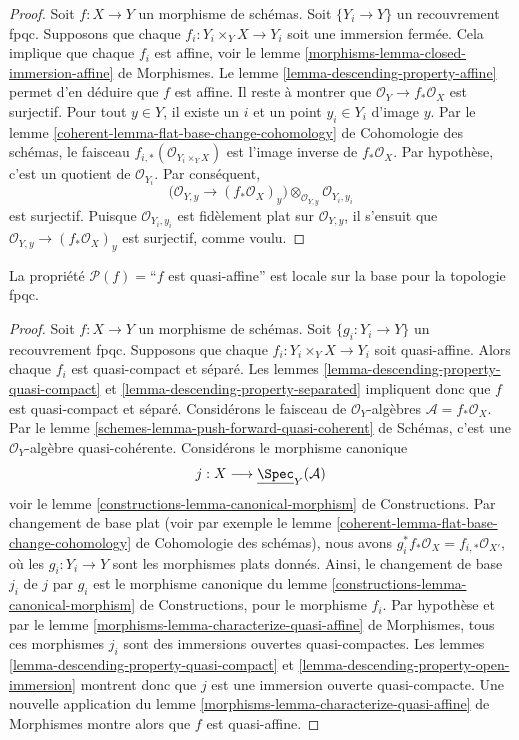 \begin{proof}
Soit $f : X \to Y$ un morphisme de schémas.
Soit $\{Y_i \to Y\}$ un recouvrement fpqc.
Supposons que chaque $f_i : Y_i \times_Y X \to Y_i$
soit une immersion fermée.
Cela implique que chaque $f_i$ est affine, voir
le lemme \ref{morphisms-lemma-closed-immersion-affine} de Morphismes.
Le lemme \ref{lemma-descending-property-affine}
permet d'en déduire que $f$ est affine. Il reste à montrer que
$\mathcal{O}_Y \to f_*\mathcal{O}_X$ est surjectif.
Pour tout $y \in Y$, il existe un $i$ et un point
$y_i \in Y_i$ d'image $y$.
Par le lemme \ref{coherent-lemma-flat-base-change-cohomology}
de Cohomologie des schémas,
le faisceau $f_{i, *}(\mathcal{O}_{Y_i \times_Y X})$
est l'image inverse de $f_*\mathcal{O}_X$.
Par hypothèse, c'est un quotient de $\mathcal{O}_{Y_i}$.
Par conséquent,
$$
\Big(
\mathcal{O}_{Y, y} \longrightarrow (f_*\mathcal{O}_X)_y
\Big)
\otimes_{\mathcal{O}_{Y, y}} \mathcal{O}_{Y_i, y_i}
$$
est surjectif. Puisque $\mathcal{O}_{Y_i, y_i}$ est fidèlement
plat sur $\mathcal{O}_{Y, y}$, il s'ensuit que
$\mathcal{O}_{Y, y} \longrightarrow (f_*\mathcal{O}_X)_y$ est surjectif,
comme voulu.
\end{proof}

\begin{lemma}
\label{lemma-descending-property-quasi-affine}
La propriété $\mathcal{P}(f) =$``$f$ est quasi-affine''
est locale sur la base pour la topologie fpqc.
\end{lemma}

\begin{proof}
Soit $f : X \to Y$ un morphisme de schémas.
Soit $\{g_i : Y_i \to Y\}$ un recouvrement fpqc.
Supposons que chaque $f_i : Y_i \times_Y X \to Y_i$
soit quasi-affine.
Alors chaque $f_i$ est quasi-compact et séparé.
Les lemmes \ref{lemma-descending-property-quasi-compact}
et \ref{lemma-descending-property-separated}
impliquent donc que $f$ est quasi-compact et séparé.
Considérons le faisceau de $\mathcal{O}_Y$-algèbres
$\mathcal{A} = f_*\mathcal{O}_X$.
Par le lemme \ref{schemes-lemma-push-forward-quasi-coherent} de Schémas,
c'est une $\mathcal{O}_Y$-algèbre quasi-cohérente.
Considérons le morphisme canonique
$$
j : X \longrightarrow \underline{\Spec}_Y(\mathcal{A})
$$
voir le lemme \ref{constructions-lemma-canonical-morphism} de Constructions.
Par changement de base plat
(voir par exemple le lemme
\ref{coherent-lemma-flat-base-change-cohomology} de Cohomologie des schémas),
nous avons $g_i^*f_*\mathcal{O}_X = f_{i, *}\mathcal{O}_{X'}$,
où les $g_i : Y_i \to Y$ sont les morphismes plats donnés.
Ainsi, le changement de base $j_i$ de $j$ par $g_i$ est le morphisme canonique
du lemme \ref{constructions-lemma-canonical-morphism} de Constructions,
pour le morphisme $f_i$. Par hypothèse et par
le lemme \ref{morphisms-lemma-characterize-quasi-affine} de Morphismes,
tous ces morphismes $j_i$ sont des immersions ouvertes quasi-compactes.
Les lemmes \ref{lemma-descending-property-quasi-compact} et
\ref{lemma-descending-property-open-immersion} montrent donc que
$j$ est une immersion ouverte quasi-compacte.
Une nouvelle application du
lemme \ref{morphisms-lemma-characterize-quasi-affine} de Morphismes
montre alors que $f$ est quasi-affine.
\end{proof}

